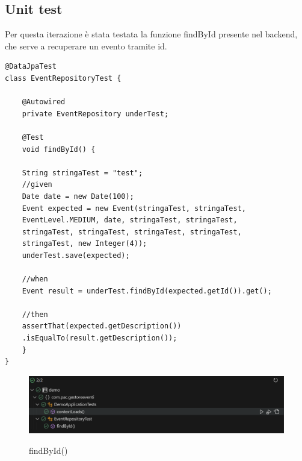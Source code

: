 \subsection{Unit test}
Per questa iterazione è stata testata la funzione findById presente nel backend, che serve a recuperare un evento tramite id.

\begin{lstlisting}
@DataJpaTest
class EventRepositoryTest {

	@Autowired
	private EventRepository underTest;
	
	@Test
	void findById() {
			
	String stringaTest = "test";
	//given
	Date date = new Date(100);
	Event expected = new Event(stringaTest, stringaTest, 
	EventLevel.MEDIUM, date, stringaTest, stringaTest, 
	stringaTest, stringaTest, stringaTest, stringaTest, 
	stringaTest, new Integer(4));
	underTest.save(expected);
	
	//when
	Event result = underTest.findById(expected.getId()).get();
	
	//then
	assertThat(expected.getDescription())
	.isEqualTo(result.getDescription());
	}
}
\end{lstlisting}

\begin{figure}[h!]
\begin{center}

  \includegraphics[width=16cm]{Iterazione 2/test/unit test/unit.PNG}\\
  \caption{findById()}
\end{center}
\end{figure}
